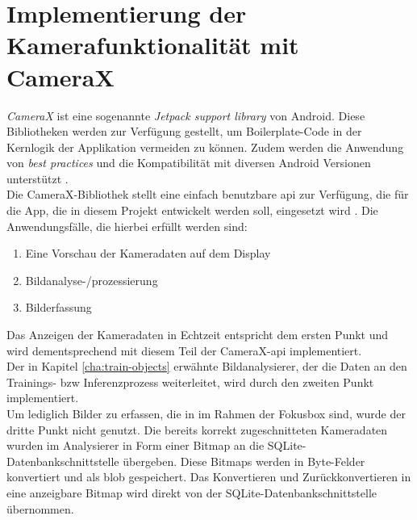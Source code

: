 \documentclass[oneside]{ausarbeitung}
\begin{document}
\section{Implementierung der Kamerafunktionalität mit CameraX}
\textit{CameraX} ist eine sogenannte \textit{Jetpack support library} von Android. Diese Bibliotheken werden zur Verfügung gestellt, um Boilerplate-Code in der Kernlogik der Applikation vermeiden zu können. Zudem werden die Anwendung von \textit{best practices} und die Kompatibilität mit diversen Android Versionen unterstützt \cite{android:jetpack}.\\
Die CameraX-Bibliothek stellt eine einfach benutzbare \ac{api} zur Verfügung, die für die App, die in diesem Projekt entwickelt werden soll, eingesetzt wird \cite{android:camerax}. Die Anwendungsfälle, die hierbei erfüllt werden sind:
\begin{enumerate}
	\item Eine Vorschau der Kameradaten auf dem Display
	\item Bildanalyse-/prozessierung
	\item Bilderfassung
\end{enumerate}
Das Anzeigen der Kameradaten in Echtzeit entspricht dem ersten Punkt und wird dementsprechend mit diesem Teil der CameraX-\ac{api} implementiert.\\
Der in Kapitel \ref{cha:train-objects} erwähnte Bildanalysierer, der die Daten an den Trainings- bzw Inferenzprozess weiterleitet, wird durch den zweiten Punkt implementiert.\\
Um lediglich Bilder zu erfassen, die in im Rahmen der Fokusbox sind, wurde der dritte Punkt nicht genutzt. Die bereits korrekt zugeschnitteten Kameradaten wurden im Analysierer in Form einer Bitmap an die SQLite-Datenbankschnittstelle übergeben. Diese Bitmaps werden in Byte-Felder konvertiert und als \ac{blob} gespeichert. Das Konvertieren und Zurückkonvertieren in eine anzeigbare Bitmap wird direkt von der SQLite-Datenbankschnittstelle übernommen.
\end{document}
